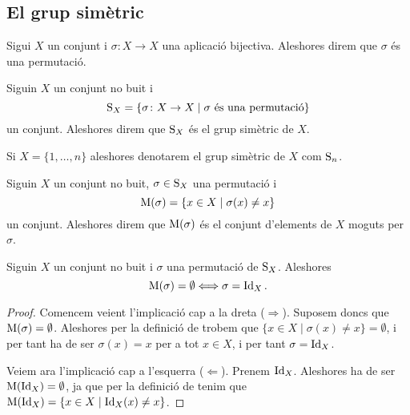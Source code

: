 \documentclass[../Apunts.tex]{subfiles}
\begin{document}
	\subsection{El grup simètric}
	\begin{definition}[Permutació]
		\label{def:permutació}
		Sigui \(X\) un conjunt i \(\sigma\colon X\rightarrow X\) una aplicació bijectiva. Aleshores direm que \(\sigma\) és una permutació.
	\end{definition}
	\begin{definition}
		\label{def:grup simètric}
		Siguin \(X\) un conjunt no buit i
		\[\operatorname{S}_{X}=\{\sigma\colon X\rightarrow X\mid\sigma\text{ és una permutació}\}\]
		un conjunt. Aleshores direm que \(\operatorname{S}_{X}\) és el grup simètric de \(X\).
		
		Si \(X=\{1,\dots,n\}\) aleshores denotarem el grup simètric de \(X\) com \(\operatorname{S}_{n}\).
	\end{definition}
	\begin{definition}
		\label{def:conjunt d'elements moguts per una permutació}
		Siguin \(X\) un conjunt no buit, \(\sigma\in\operatorname{S}_{X}\) una permutació i
		\[\operatorname{M}(\sigma)=\{x\in X\mid\sigma(x)\neq x\}\]
		un conjunt. Aleshores direm que \(\operatorname{M}(\sigma)\) és el conjunt d'elements de \(X\) moguts per \(\sigma\).
	\end{definition}
	\begin{proposition}
		\label{prop:permutació identitat si i només si no mou res}
		\label{prop:permutació no mou res si i només si és la identitat}
		Siguin \(X\) un conjunt no buit i \(\sigma\) una permutació de \(\operatorname{S}_{X}\). Aleshores
		\[\operatorname{M}(\sigma)=\emptyset\Longleftrightarrow\sigma=\operatorname{Id}_{X}.\]
		\begin{proof}
			Comencem veient l'implicació cap a la dreta (\(\Rightarrow\)). Suposem doncs que \(\operatorname{M}(\sigma)=\emptyset\). Aleshores per la definició de  trobem que \(\{x\in X\mid\sigma(x)\neq x\}=\emptyset\), i per tant ha de ser \(\sigma(x)=x\) per a tot \(x\in X\), i per tant \(\sigma=\operatorname{Id}_{X}\).
			
			Veiem ara l'implicació cap a l'esquerra (\(\Leftarrow\)). Prenem \(\operatorname{Id}_{X}\). Aleshores ha de ser \(\operatorname{M}(\operatorname{Id}_{X})=\emptyset\), ja que per la definició de  tenim que \(\operatorname{M}(\operatorname{Id}_{X})=\{x\in X\mid\operatorname{Id}_{X}(x)\neq x\}\).
		\end{proof}
	\end{proposition}
\end{document}

